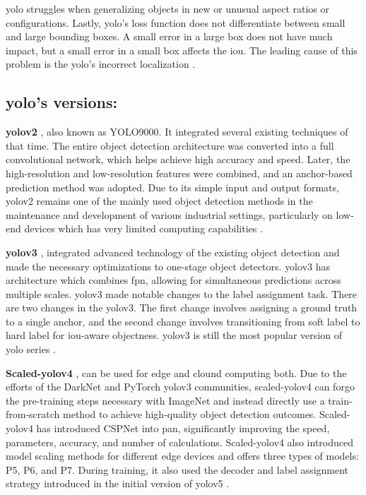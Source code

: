 \gls{yolo} struggles when generalizing objects in new or unusual aspect ratios or configurations. Lastly, \gls{yolo}'s loss function does not differentiate between small and large bounding boxes. A small error in a large box does not have much impact, but a small error in a small box affects the \gls{iou}. The leading cause of this problem is the \gls{yolo}'s incorrect localization \cite{redmon2016you}.

\subsection*{\gls{yolo}'s versions: }

\textbf{\gls{yolo}v2} \cite{redmon2017yolo9000}, also known as YOLO9000. It integrated several existing techniques of that time. The entire object detection architecture was converted into a full convolutional network, which helps achieve high accuracy and speed. Later, the high-resolution and low-resolution features were combined, and an anchor-based prediction method was adopted. Due to its simple input and output formats, \gls{yolo}v2 remains one of the mainly used object detection methods in the maintenance and development of various industrial settings, particularly on low-end devices which has very limited computing capabilities \cite{wang2024yolov1}.

\textbf{\gls{yolo}v3} \cite{redmon2018yolov3}, integrated advanced technology of the existing object detection and made the necessary optimizations to one-stage object detectors. \gls{yolo}v3 has architecture which combines \gls{fpn}, allowing for simultaneous predictions across multiple scales. \gls{yolo}v3 made notable changes to the label assignment task. There are two changes in the \gls{yolo}v3. The first change involves assigning a ground truth to a single anchor, and the second change involves transitioning from soft label to hard label for \gls{iou}-aware objectness. \gls{yolo}v3 is still the most popular version of \gls{yolo} series \cite{wang2024yolov1}.

\textbf{Scaled-\gls{yolo}v4} \cite{wang2021scaled}, can be used for edge and clound computing both. Due to the efforts of the DarkNet and PyTorch \gls{yolo}v3 communities, scaled-\gls{yolo}v4 can forgo the pre-training steps necessary with ImageNet and instead directly use a train-from-scratch method to achieve high-quality object detection outcomes. Scaled-\gls{yolo}v4 has introduced CSPNet into \gls{pan}, significantly improving the speed, parameters, accuracy, and number of calculations. Scaled-\gls{yolo}v4 also introduced model scaling methods for different edge devices and offers three types of models: P5, P6, and P7. During training, it also used the decoder and label assignment strategy introduced in the initial version of \gls{yolo}v5 \cite{wang2024yolov1}.

